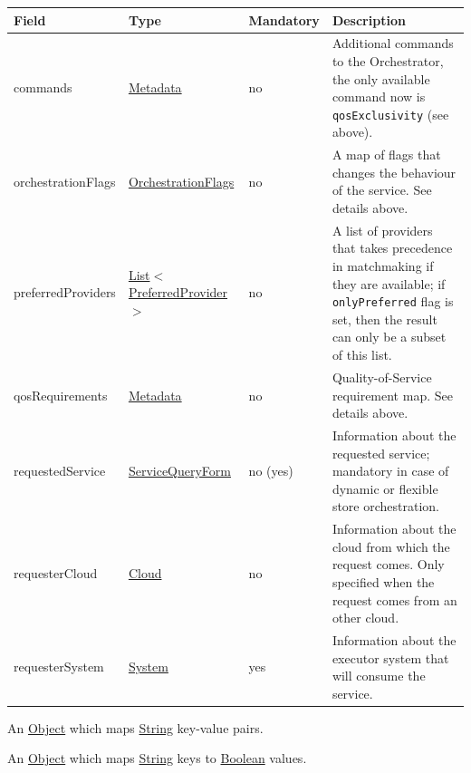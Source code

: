 \documentclass[a4paper]{arrowhead}
\newcommand{\pref}[1]{{\textcolor{ArrowheadGrey}{\hyperref[sec:model:primitives:#1]{#1}}}}
\begin{document}
\begin{table}[ht!]
\begin{tabularx}{\textwidth}{| p{4cm} | p{4cm} | p{2cm} | X |} \hline
\rowcolor{gray!33} Field & Type & Mandatory & Description \\ \hline
commands &\hyperref[sec:model:Metadata]{Metadata} & no & Additional commands to the Orchestrator, the only available command now is \texttt{qosExclusivity} (see above). \\ \hline
orchestrationFlags &\hyperref[sec:model:OrchestrationFlags]{OrchestrationFlags} & no & A map of flags that changes the behaviour of the service. See details above. \\ \hline
preferredProviders &\pref{List}$<$\hyperref[sec:model:PreferredProvider]{PreferredProvider}$>$ & no & A list of providers that takes precedence in matchmaking if they are available; if \texttt{onlyPreferred} flag is set, then the result can only be a subset of this list. \\ \hline
qosRequirements &\hyperref[sec:model:Metadata]{Metadata} & no & Quality-of-Service requirement map. See details above. \\ \hline
requestedService &\hyperref[sec:model:SQF]{ServiceQueryForm} & no (yes) & Information about the requested service; mandatory in case of dynamic or flexible store orchestration. \\ \hline
requesterCloud &\hyperref[sec:model:Cloud]{Cloud} & no & Information about the cloud from which the request comes. Only specified when the request comes from an other cloud. \\ \hline
requesterSystem &\hyperref[sec:model:System]{System} & yes & Information about the executor system that will consume the service. \\ \hline
\end{tabularx}
\end{table}

\label{sec:model:Metadata}

An \pref{Object} which maps \pref{String} key-value pairs.

\label{sec:model:OrchestrationFlags}

An \pref{Object} which maps \pref{String} keys to \pref{Boolean} values. 

\clearpage

\label{sec:model:PreferredProvider}
\end{document}
